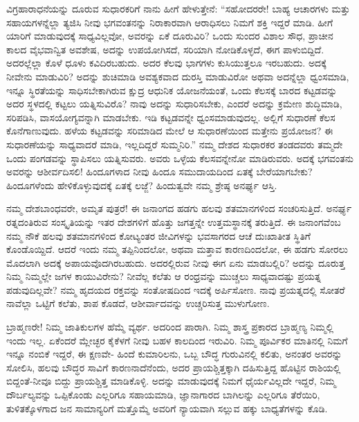 ವಿಗ್ರಹಾರಾಧನೆಯನ್ನು ದೂರುವ ಸುಧಾರಕರಿಗೆ ನಾನು ಹೀಗೆ ಹೇಳುತ್ತೇನೆ: “ಸಹೋದರರೇ! ಬಾಹ್ಯ ಆಚಾರಗಳು ಮತ್ತು ಸಹಾಯಗಳನ್ನೆಲ್ಲಾ ತ್ಯಜಿಸಿ ನೀವು ಭಗವಂತನನ್ನು ನಿರಾಕಾರವಾಗಿ ಆರಾಧಿಸಲು ನಿಮಗೆ ಶಕ್ತಿ ಇದ್ದರೆ ಮಾಡಿ. ಹೀಗೆ ಯಾರಿಗೆ ಮಾಡುವುದಕ್ಕೆ ಸಾಧ್ಯವಿಲ್ಲವೋ, ಅವರನ್ನು ಏಕೆ ದೂರುವಿರಿ? ಒಂದು ಸುಂದರ ವಿಶಾಲ ಸೌಧ, ಪ್ರಾಚೀನ ಕಾಲದ ವೈಭವಾನ್ವಿತ ಅವಶೇಷ, ಅದನ್ನು ಉಪಯೋಗಿಸದೆ, ಸರಿಯಾಗಿ ನೋಡಿಕೊಳ್ಳದೆ, ಈಗ ಪಾಳುಬಿದ್ದಿದೆ. ಅದರಲ್ಲೆಲ್ಲಾ ಕೊಳೆ ಧೂಳು ಕವಿದಿರಬಹುದು. ಅದರ ಕೆಲವು ಭಾಗಗಳು ಕುಸಿಯುತ್ತಲೂ ಇರಬಹುದು. ಅದಕ್ಕೆ ನೀವೇನು ಮಾಡುವಿರಿ? ಅದನ್ನು ಶುಚಿಮಾಡಿ ಅವಶ್ಯಕವಾದ ದುರಸ್ತಿ ಮಾಡುವಿರೋ ಅಥವಾ ಅದನ್ನೆಲ್ಲಾ ಧ್ವಂಸಮಾಡಿ, ಇನ್ನೂ ಸ್ಥಿರತೆಯನ್ನು ಸಾಧಿಸಬೇಕಾಗಿರುವ ಕ್ಷುದ್ರ ಆಧುನಿಕ ಯೋಜನೆಯಂತೆ, ಒಂದು ಕೆಲಸಕ್ಕೆ ಬಾರದ ಕಟ್ಟಡವನ್ನು ಅದರ ಸ್ಥಳದಲ್ಲಿ ಕಟ್ಟಲು ಯತ್ನಿಸುವಿರೊ? ನಾವು ಅದನ್ನು ಸುಧಾರಿಸಬೇಕು, ಎಂದರೆ ಅದನ್ನು ಕ್ರಮೇಣ ಶುದ್ಧಿಮಾಡಿ, ಸರಿಪಡಿಸಿ, ವಾಸಯೋಗ್ಯವನ್ನಾಗಿ ಮಾಡಬೇಕು. ಇಡಿ ಕಟ್ಟಡವನ್ನೇ ಧ್ವಂಸಮಾಡುವುದಲ್ಲ. ಅಲ್ಲಿಗೆ ಸುಧಾರಣೆ ಕೆಲಸ ಕೊನೆಗಾಣುವುದು. ಹಳೆಯ ಕಟ್ಟಡವನ್ನು ಸರಿಮಾಡಿದ ಮೇಲೆ ಆ ಸುಧಾರಣೆಯಿಂದ ಮತ್ತೇನು ಪ್ರಯೋಜನ? ಈ ಸುಧಾರಣೆಯನ್ನು ಸಾಧ್ಯವಾದರೆ ಮಾಡಿ, ಇಲ್ಲದಿದ್ದರೆ ಸುಮ್ಮನಿರಿ.” ನಮ್ಮ ದೇಶದ ಸುಧಾರಕರ ತಂಡದವರು ತಮ್ಮದೇ ಒಂದು ಪಂಗಡವನ್ನು ಸ್ಥಾಪಿಸಲು ಯತ್ನಿಸುವರು. ಅವರು ಒಳ್ಳೆಯ ಕೆಲಸವನ್ನೇನೋ ಮಾಡಿರುವರು. ಅದಕ್ಕೆ ಭಗವಂತನು ಅವರನ್ನು ಆಶೀರ್ವದಿಸಲಿ! ಹಿಂದೂಗಳಾದ ನೀವು ಹಿಂದೂ ಸಮುದಾಯದಿಂದ ಏತಕ್ಕೆ ಬೇರೆಯಾಗಬೇಕು? ಹಿಂದೂಗಳೆಂದು ಹೇಳಿಕೊಳ್ಳುವುದಕ್ಕೆ ಏತಕ್ಕೆ ಲಜ್ಜೆ? ಹಿಂದುತ್ವವೇ ನಮ್ಮ ಶ್ರೇಷ್ಠ ಅನರ್ಘ್ಯ ಆಸ್ತಿ.

ನಮ್ಮ ದೇಶಬಾಂಧವರೇ, ಅಮೃತ ಪುತ್ರರೆ! ಈ ಜನಾಂಗದ ಹಡಗು ಹಲವು ಶತಮಾನಗಳಿಂದ ಸಂಚರಿಸುತ್ತಿದೆ. ಅನರ್ಘ್ಯ ರತ್ನದಂತಿರುವ ಸಂಸ್ಕೃತಿಯನ್ನು ಇತರ ದೇಶಗಳಿಗೆ ಹೊತ್ತು ಜಗತ್ತನ್ನೇ ಉತ್ತಮಸ್ಥಾನಕ್ಕೆ ತರುತ್ತಿದೆ. ಈ ಜನಾಂಗವೆಂಬ ನಮ್ಮ ನೌಕೆ ಹಲವು ಶತಮಾನಗಳಿಂದ ಕೋಟ್ಯಂತರ ಜೀವಿಗಳನ್ನು ಭವಸಾಗರದ ಆಚೆ ದುಃಖಾತೀತ ಸ್ಥಿತಿಗೆ ಕೊಂಡೊಯ್ದಿದೆ. ಆದರೆ ಇಂದು ನಮ್ಮ ತಪ್ಪಿನಿಂದಲೋ, ಅಥವಾ ಮತ್ತಾವ ಕಾರಣದಿಂದಲೋ, ಈ ಹಡಗು ಸೋರಲು ಮೊದಲಾಗಿ ಅದಕ್ಕೆ ಅಪಾಯವೊದಗಿರಬಹುದು. ಅದರಲ್ಲಿರುವ ನೀವು ಈಗ ಏನು ಮಾಡಬಲ್ಲಿರಿ? ಅದನ್ನು ದೂರುತ್ತ ನಿಮ್ಮ ನಿಮ್ಮಲ್ಲೇ ಜಗಳ ಕಾಯುವಿರೇನು? ನೀವೆಲ್ಲ ಕಲೆತು ಆ ರಂಧ್ರವನ್ನು ಮುಚ್ಚಲು ಸಾಧ್ಯವಾದಷ್ಟು ಪ್ರಯತ್ನ ಪಡುವುದಿಲ್ಲವೇ? ನಮ್ಮ ಹೃದಯದ ರಕ್ತವನ್ನು ಸಂತೋಷದಿಂದ ಇದಕ್ಕೆ ಅರ್ಪಿಸೋಣ. ನಾವು ಪ್ರಯತ್ನದಲ್ಲಿ ಸೋತರೆ ನಾವೆಲ್ಲಾ ಒಟ್ಟಿಗೆ ಕಲೆತು, ಶಾಪ ಕೊಡದೆ, ಆಶೀರ್ವಾದವನ್ನು ಉಚ್ಚರಿಸುತ್ತ ಮುಳುಗೋಣ.

ಬ್ರಾಹ್ಮಣರೇ! ನಿಮ್ಮ ಜಾತಿಕುಲಗಳ ಹೆಮ್ಮೆ ವ್ಯರ್ಥ. ಅದರಿಂದ ಪಾರಾಗಿ. ನಿಮ್ಮ ಶಾಸ್ತ್ರ ಪ್ರಕಾರದ ಬ್ರಾಹ್ಮಣ್ಯ ನಿಮ್ಮಲ್ಲಿ ಇಂದು ಇಲ್ಲ. ಏಕೆಂದರೆ ಮ್ಲೇಚ್ಛರ ಕೈಕೆಳಗೆ ನೀವು ಬಹಳ ಕಾಲದಿಂದ ಇರುವಿರಿ. ನಿಮ್ಮ ಪೂರ್ವಿಕರ ಮಾತಿನಲ್ಲಿ ನಿಮಗೆ ಇನ್ನೂ ನಂಬಿಕೆ ಇದ್ದರೆ, ಈ ಕ್ಷಣವೇ- ಹಿಂದೆ ಕುಮಾರಿಲನು, ಒಬ್ಬ ಬೌದ್ಧ ಗುರುವಿನಲ್ಲಿ ಕಲಿತು, ಅನಂತರ ಅವರನ್ನು ಸೋಲಿಸಿ, ಹಲವು ಬೌದ್ಧರ ಸಾವಿಗೆ ಕಾರಣನಾದೆನೆಂದು, ಅದರ ಪ್ರಾಯಶ್ಚಿತ್ತಕ್ಕಾಗಿ ದಹಿಸುತ್ತಿದ್ದ ಹೊಟ್ಟಿನ ರಾಶಿಯಲ್ಲಿ ಬಿದ್ದಂತೆ-ನೀವೂ ಬಿದ್ದು ಪ್ರಾಯಶ್ಚಿತ್ತ ಮಾಡಿಕೊಳ್ಳಿ. ಅದನ್ನು ಮಾಡುವುದಕ್ಕೆ ನಿಮಗೆ ಧೈರ್ಯವಿಲ್ಲದೇ ಇದ್ದರೆ, ನಿಮ್ಮ ದೌರ್ಬಲ್ಯವನ್ನು ಒಪ್ಪಿಕೊಂಡು ಎಲ್ಲರಿಗೂ ಸಹಾಯಮಾಡಿ, ಜ್ಞಾನಾಗಾರದ ಬಾಗಿಲನ್ನು ಎಲ್ಲರಿಗೂ ತೆರೆಯಿರಿ, ತುಳಿತಕ್ಕೊಳಗಾದ ಜನ ಸಾಮಾನ್ಯರಿಗೆ ಮತ್ತೊಮ್ಮೆ ಅವರಿಗೆ ನ್ಯಾಯವಾಗಿ ಸಲ್ಲುವ ಹಕ್ಕು ಬಾಧ್ಯತೆಗಳನ್ನು ಕೊಡಿ.

